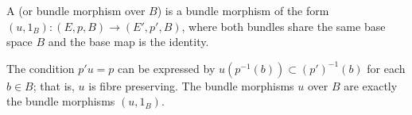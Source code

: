 A  (or bundle morphism over $B$) is a bundle morphism of the form $(u, 1_B): (E, p, B) \rightarrow (E', p', B)$, where both bundles share the same base space $B$ and the base map is the identity.

The condition $p'u = p$ can be expressed by $u(p^{-1}(b)) \subset (p')^{-1}(b)$ for each $b \in B$; that is, $u$ is fibre preserving. The bundle morphisms $u$ over $B$ are exactly the bundle morphisms $(u, 1_B)$.
